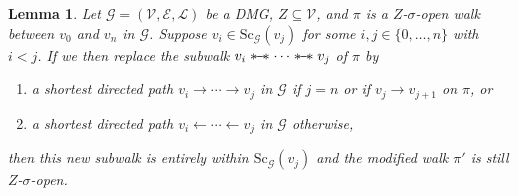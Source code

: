\documentclass[accepted]{uai2025} %
\newtheorem{lemma}{Lemma}
\newcommand{\tuh}{\mathrel{\rightarrow}}
\newcommand{\hut}{\mathrel{\leftarrow}}
\newcommand{\sus}{\mathrel{{\ast\mkern-11mu\relbar\mkern-9mu\relbar\mkern-11mu\ast}}}
\begin{document}
\begin{lemma} \label{lemma3.3.10}
Let $\mathcal{G}=(\mathcal{V},\mathcal{E},\mathcal{L})$ be a DMG, $Z\subseteq \mathcal{V}$, and $\pi$ is a $Z$-$\sigma$-open walk between $v_0$ and $v_n$ in $\mathcal{G}$. Suppose $v_i\in\text{Sc}_\mathcal{G}(v_j)$ for some $i,j\in\{0,\ldots,n\}$ with $i<j$. If we then replace the subwalk $v_i\sus\cdots\sus v_j$ of $\pi$ by
\begin{enumerate}
    \item a shortest directed path $v_i\tuh\cdots\tuh v_j$ in $\mathcal{G}$ if $j=n$ or if $v_j\tuh v_{j+1}$ on $\pi$, or
    \item a shortest directed path $v_i\hut\cdots\hut v_j$ in $\mathcal{G}$ otherwise,
\end{enumerate}
then this new subwalk is entirely within $\text{Sc}_\mathcal{G}(v_j)$ and the modified walk $\pi'$ is still $Z$-$\sigma$-open.
\end{lemma}
\end{document}
